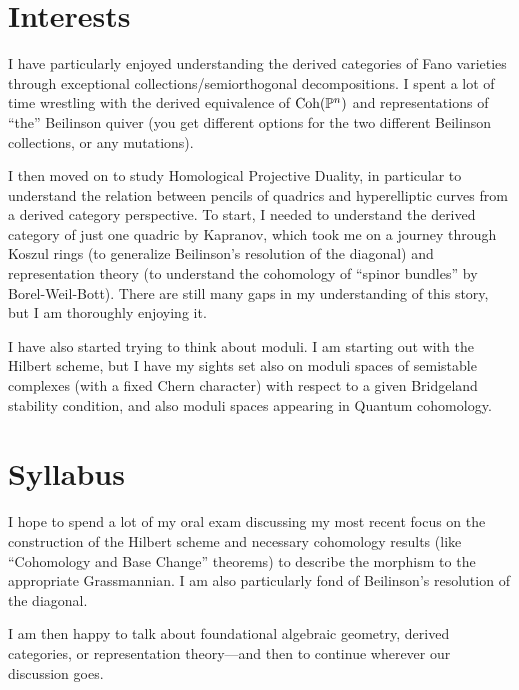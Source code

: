 \documentclass[12pt]{article}
\begin{document}
\section{Interests}

I have particularly enjoyed understanding the derived categories of Fano varieties through exceptional collections/semiorthogonal decompositions. I spent a lot of time wrestling with the derived equivalence of $\operatorname{Coh}(\mathbb{P}^n)$ and representations of ``the'' Beilinson quiver (you get different options for the two different Beilinson collections, or any mutations).

I then moved on to study Homological Projective Duality, in particular to understand the relation between pencils of quadrics and hyperelliptic curves from a derived category perspective. To start, I needed to understand the derived category of just one quadric by Kapranov, which took me on a journey through Koszul rings (to generalize Beilinson's resolution of the diagonal) and representation theory (to understand the cohomology of ``spinor bundles'' by Borel-Weil-Bott). There are still many gaps in my understanding of this story, but I am thoroughly enjoying it.

I have also started trying to think about moduli. I am starting out with the Hilbert scheme, but I have my sights set also on moduli spaces of semistable complexes (with a fixed Chern character) with respect to a given Bridgeland stability condition, and also moduli spaces appearing in Quantum cohomology.

\section{Syllabus}

I hope to spend a lot of my oral exam discussing my most recent focus on the construction of the Hilbert scheme and necessary cohomology results (like ``Cohomology and Base Change'' theorems) to describe the morphism to the appropriate Grassmannian. I am also particularly fond of Beilinson's resolution of the diagonal.

I am then happy to talk about foundational algebraic geometry, derived categories, or representation theory---and then to continue wherever our  discussion goes.
\end{document}
